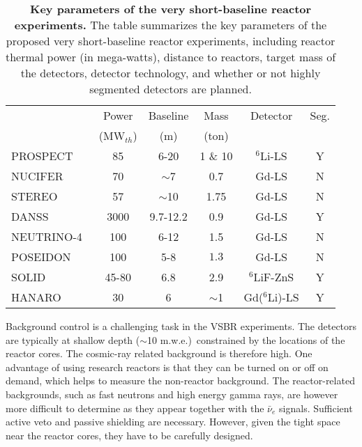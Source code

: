 \documentclass[aps,twocolumn,preprintnumbers,amsmath,superscriptaddress,amssymb,floats,nofootinbib]{revtex4-1}
\begin{document}
\begin{table}[tb]
  \begin{tabular}{lccccc}
  \hline
  & Power & Baseline & Mass & Detector & Seg. \\
  & (MW$_{th}$) & (m) & (ton) &    & \\
  \hline
  PROSPECT~\cite{PROSPECT}  & 85  & 6-20 & 1 \& 10  & $^6$Li-LS & Y \\
  NUCIFER~\cite{NUCIFER-2010}   & 70 & $\sim$7  & 0.7 & Gd-LS & N \\
  STEREO~\cite{sterileWP} & 57  & $\sim$10 & 1.75  & Gd-LS & N \\
  DANSS~\cite{DANSS} & 3000  & 9.7-12.2  & 0.9  & Gd-LS & Y \\
  NEUTRINO-4~\cite{NEUTRINO4-2012} & 100  & 6-12  & 1.5  & Gd-LS & N \\
  POSEIDON~\cite{POSEIDON} & 100  & 5-8  & $1.3$ & Gd-LS & N \\
  SOLID~\cite{Lasserre-Neutrino14} & 45-80 & 6.8  & 2.9  & $^6$LiF-ZnS & Y \\
  HANARO~\cite{HANARO} & 30  & 6  & $\sim$1  & Gd($^6$Li)-LS & Y \\
  \hline
  \end{tabular}
  \caption{{\bf Key parameters of the very short-baseline reactor experiments.} The table summarizes the key parameters of the proposed very short-baseline reactor experiments, including reactor thermal power (in mega-watts), distance to reactors, target mass of the detectors, detector technology, and whether or not highly segmented detectors are planned.}
\label{tab:sterile}
\end{table}

Background control is a challenging task in the VSBR experiments. 
The detectors are typically at shallow depth ($\sim$10 m.w.e.)\ constrained by the locations of the reactor cores. 
The cosmic-ray related background is therefore high. 
One advantage of using research reactors is that they can be turned on or off on demand, which helps to measure the non-reactor background. 
The reactor-related backgrounds, such as fast neutrons and high energy gamma rays, are however more difficult to determine
as they appear together with the $\bar\nu_e$ signals. 
Sufficient active veto and passive shielding are necessary. However, given the tight space near the reactor cores,  they have to be carefully designed.
\end{document}
